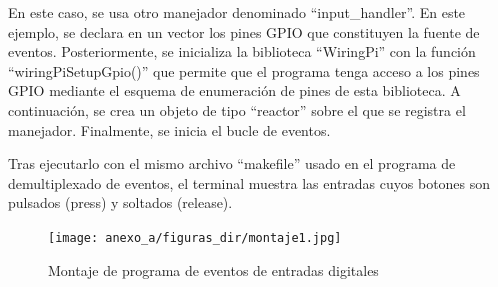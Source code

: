 \begin{itemize}
    

En este caso, se usa otro manejador denominado ``input\_handler''. En este ejemplo, se declara en un vector los pines GPIO que constituyen la fuente de eventos. Posteriormente, se inicializa la biblioteca ``WiringPi'' con la función ``wiringPiSetupGpio()'' que permite que el programa tenga acceso a los pines GPIO mediante el esquema de enumeración de pines de esta biblioteca. A continuación, se crea un objeto de tipo ``reactor'' sobre el que se registra el manejador. Finalmente, se inicia el bucle de eventos.

Tras ejecutarlo con el mismo archivo ``makefile'' usado en el programa de demultiplexado de eventos, el terminal muestra las entradas cuyos botones son pulsados (press) y soltados (release).

    \begin{figure}
    \centering
    \texttt{[image: anexo\_a/figuras\_dir/montaje1.jpg]}
    \caption{Montaje de programa de eventos de entradas digitales}
    \end{figure}


\end{itemize}
